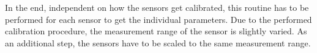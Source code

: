 In the end, independent on how the sensors get calibrated, this routine has to be performed for each sensor to get the individual parameters. Due to the performed calibration procedure, the measurement range of the sensor is slightly varied. As an additional step, the sensors have to be scaled to the same measurement range. 

%
